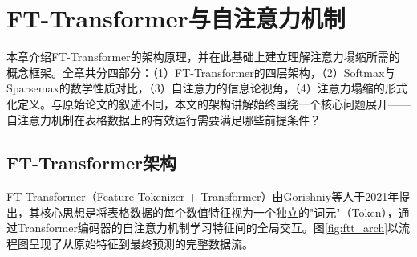 
\section{FT-Transformer与自注意力机制}
\label{sec:background}

本章介绍FT-Transformer的架构原理，并在此基础上建立理解注意力塌缩所需的概念框架。全章共分四部分：（1）FT-Transformer的四层架构，（2）Softmax与Sparsemax的数学性质对比，（3）自注意力的信息论视角，（4）注意力塌缩的形式化定义。与原始论文\cite{gorishniy2021revisiting}的叙述不同，本文的架构讲解始终围绕一个核心问题展开——自注意力机制在表格数据上的有效运行需要满足哪些前提条件？

\subsection{FT-Transformer架构}

FT-Transformer（Feature Tokenizer + Transformer）由Gorishniy等人\cite{gorishniy2021revisiting}于2021年提出，其核心思想是将表格数据的每个数值特征视为一个独立的"词元"（Token），通过Transformer编码器的自注意力机制学习特征间的全局交互。图\ref{fig:ftt_arch}以流程图呈现了从原始特征到最终预测的完整数据流。

